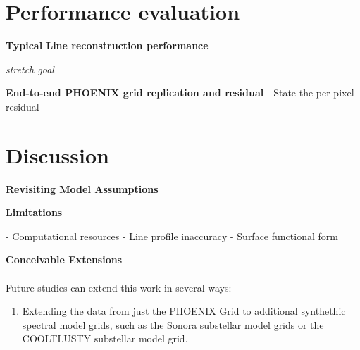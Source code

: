 \documentclass[twocolumn]{aastex631}
\begin{document}
\section{Performance evaluation}

\begin{mdframed}
    \textbf{Typical Line reconstruction performance}
    \textcolor{lightgray}{\blindtext}
\end{mdframed}

\begin{mdframed}
    \emph{stretch goal}\par
    \textbf{End-to-end PHOENIX grid replication and residual}
    - State the per-pixel residual
    \textcolor{lightgray}{\blindtext}
\end{mdframed}


\section{Discussion}
\begin{mdframed}
    \textbf{Revisiting Model Assumptions}

    \textcolor{lightgray}{\blindtext}
\end{mdframed}

\begin{mdframed}
    \textbf{Limitations}

    - Computational resources
    - Line profile inaccuracy
    - Surface functional form

    \textcolor{lightgray}{\blindtext}
\end{mdframed}


\begin{mdframed}
    \textbf{Conceivable Extensions}
    \\-------------\\
    Future studies can extend this work in several ways:
    \begin{enumerate}[label=-]
        \item Extending the data from just the PHOENIX Grid to additional synthethic spectral
              model grids, such as the Sonora substellar model grids or the COOLTLUSTY substellar model grid.
    \end{enumerate}
\end{mdframed}


\pagebreak
\newpage

\begin{acknowledgments}
    \blindtext
\end{acknowledgments}
\end{document}
